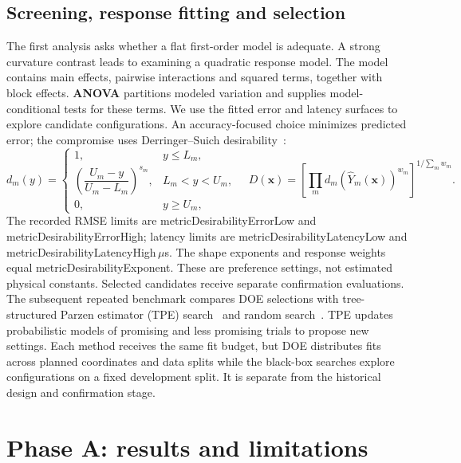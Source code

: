 \documentclass[12pt,a4paper]{article}
\newcommand{\m}[1]{\csname metric#1\endcsname}
\newcommand{\term}[1]{\textbf{#1}}
\begin{document}
\subsection{Screening, response fitting and selection}
The first analysis asks whether a flat first-order model is adequate. A strong curvature contrast leads to examining a quadratic response model. The model contains main effects, pairwise interactions and squared terms, together with block effects. \term{ANOVA} partitions modeled variation and supplies model-conditional tests for these terms.
We use the fitted error and latency surfaces to explore candidate configurations. An accuracy-focused choice minimizes predicted error; the compromise uses Derringer--Suich desirability~\cite{desirability}:
\begin{equation}\label{eq:desirability}
d_m(y)=\begin{cases}1,&y\le L_m,\\ \left(\dfrac{U_m-y}{U_m-L_m}\right)^{s_m},&L_m<y<U_m,\\0,&y\ge U_m,\end{cases}
\quad D(\mathbf{x})=\left[\prod_m d_m(\widehat Y_m(\mathbf{x}))^{w_m}\right]^{1/\sum_m w_m}.
\end{equation}
The recorded RMSE limits are \m{DesirabilityErrorLow} and \m{DesirabilityErrorHigh}; latency limits are \m{DesirabilityLatencyLow} and \m{DesirabilityLatencyHigh}\,$\mu$s. The shape exponents and response weights equal \m{DesirabilityExponent}. These are preference settings, not estimated physical constants. Selected candidates receive separate confirmation evaluations.
The subsequent repeated benchmark compares DOE selections with tree-structured Parzen estimator (TPE) search~\cite{tpe} and random search~\cite{randomsearch}. TPE updates probabilistic models of promising and less promising trials to propose new settings. Each method receives the same fit budget, but DOE distributes fits across planned coordinates and data splits while the black-box searches explore configurations on a fixed development split. It is separate from the historical design and confirmation stage.
\section{Phase A: results and limitations}
\end{document}
